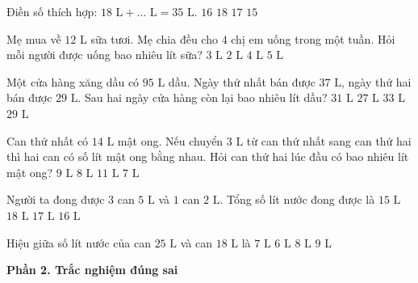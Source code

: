 \begin{ex} %
Điền số thích hợp: $18\text{ L} + \dots\text{ L} = 35\text{ L}$.
\choice
{$16$}
{$18$}
{\True $17$}
{$15$}
\end{ex}

\begin{ex} %
Mẹ mua về $12\text{ L}$ sữa tươi. Mẹ chia đều cho $4$ chị em uống trong một tuần. Hỏi mỗi người được uống bao nhiêu lít sữa?
\choice
{\True $3\text{ L}$}
{$2\text{ L}$}
{$4\text{ L}$}
{$5\text{ L}$}
\end{ex}

\begin{ex} %
Một cửa hàng xăng dầu có $95\text{ L}$ dầu. Ngày thứ nhất bán được $37\text{ L}$, ngày thứ hai bán được $29\text{ L}$. Sau hai ngày cửa hàng còn lại bao nhiêu lít dầu?
\choice
{$31\text{ L}$}
{$27\text{ L}$}
{$33\text{ L}$}
{\True $29\text{ L}$}
\end{ex}

\begin{ex} %
Can thứ nhất có $14\text{ L}$ mật ong. Nếu chuyển $3\text{ L}$ từ can thứ nhất sang can thứ hai thì hai can có số lít mật ong bằng nhau. Hỏi can thứ hai lúc đầu có bao nhiêu lít mật ong?
\choice
{$9\text{ L}$}
{\True $8\text{ L}$}
{$11\text{ L}$}
{$7\text{ L}$}
\end{ex}

\begin{ex} %
Người ta đong được $3$ can $5\text{ L}$ và $1$ can $2\text{ L}$. Tổng số lít nước đong được là
\choice
{$15\text{ L}$}
{$18\text{ L}$}
{\True $17\text{ L}$}
{$16\text{ L}$}
\end{ex}

\begin{ex} %
Hiệu giữa số lít nước của can $25\text{ L}$ và can $18\text{ L}$ là
\choice
{\True $7\text{ L}$}
{$6\text{ L}$}
{$8\text{ L}$}
{$9\text{ L}$}
\end{ex}

\textbf{Phần 2. Trắc nghiệm đúng sai}

